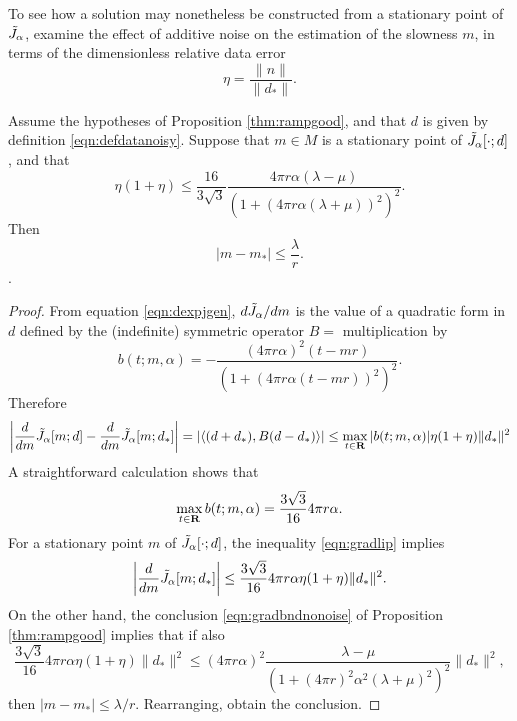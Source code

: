 {To see how a solution may
  nonetheless be constructed from a stationary point of $\tilde{J}_{\alpha}$,
  examine the effect of additive noise on the estimation of the
slowness $m$, in terms of the dimensionless
relative data error}
\begin{equation}
  \label{eqn:defeta}
  \eta = \frac{\|n\|}{\|d_*\|}. 
\end{equation}

\begin{proposition}
  \label{thm:mnoise}
  Assume the hypotheses of Proposition \ref{thm:rampgood}, and that $d$ is
  given by definition \ref{eqn:defdatanoisy}. Suppose that $m \in M$
  is a stationary point of $\tilde{J}_{\alpha}[\cdot;d]$, and that
  \begin{equation}
    \label{eqn:mnoisebnd}
    \eta(1+\eta) \le \frac{16}{3\sqrt{3}}\frac{4\pi r \alpha
      (\lambda-\mu)}{(1+(4\pi r\alpha(\lambda+\mu))^2)^2}.
  \end{equation}
  Then
  \begin{equation}
    \label{eqn:mnoisebndfin}
    |m-m_*| \le \frac{\lambda}{r}.
  \end{equation}.
\end{proposition}

\begin{proof}
  From equation \ref{eqn:dexpjgen}, $d \tilde{J}_{\alpha} / dm$ is the
  value of a quadratic form in $d$
  {defined by the}
  (indefinite) symmetric operator
$B = $ multiplication by
\[
  b(t;m,\alpha)  = -\frac{(4 \pi r \alpha)^2 (t-mr)}{(1+(4\pi r \alpha (t-mr))^2)^{2}}.
\]
Therefore
\begin{equation}
  \label{eqn:gradlip}
  \left|\frac{d}{dm}\tilde{J}_{\alpha}[m;d]-\frac{d}{dm}\tilde{J}_{\alpha}[m;d_*]\right| =
  |\langle (d+d_*),B(d-d_*)\rangle| \le \max_{t \in
    {\bf R}}|b(t;m,\alpha)|\eta(1+\eta)\|d_*\|^2
\end{equation}
A straightforward calculation shows that
\[
  \max_{t \in {\bf R}} b(t;m,\alpha) = \frac{3\sqrt{3}}{16} 4\pi r\alpha.
\]
For a stationary point $m$ of
$\tilde{J}_{\alpha}[\cdot;d]$, the inequality \ref{eqn:gradlip} implies
\[
  \left|\frac{d}{dm}\tilde{J}_{\alpha}[m;d_*]\right| \le \frac{3\sqrt{3}}{16} 4\pi
  r\alpha \eta(1+\eta)\|d_*\|^2.
\]
On the other hand, the conclusion \ref{eqn:gradbndnonoise} of Proposition
\ref{thm:rampgood} implies that if also
\[
  \frac{3\sqrt{3}}{16} 4\pi r\alpha \eta(1+\eta)\|d_*\|^2 \le (4 \pi r
  \alpha)^2 \frac{\lambda-\mu}{(1+(4\pi r)^2\alpha^2
    (\lambda+\mu)^2)^{2}} \|d_*\|^2,
\]
then $|m-m_*|\le \lambda/r$. Rearranging, obtain the conclusion.
\end{proof}

